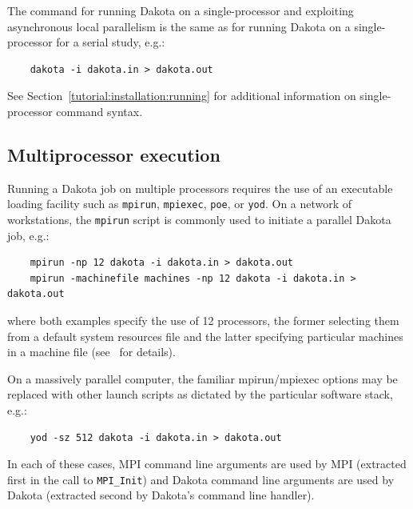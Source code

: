 The command for running Dakota on a single-processor and exploiting
asynchronous local parallelism is the same as for running Dakota on a
single-processor for a serial study, e.g.:
\begin{small}
\begin{verbatim}
    dakota -i dakota.in > dakota.out
\end{verbatim}
\end{small}

See Section~\ref{tutorial:installation:running} for additional
information on single-processor command syntax.

\subsection{Multiprocessor execution}\label{parallel:running:multiprocessor}

Running a Dakota job on multiple processors requires the use of an
executable loading facility such as \texttt{mpirun}, \texttt{mpiexec},
\texttt{poe}, or \texttt{yod}.  On a network of workstations, the
\texttt{mpirun} script is commonly used to initiate a parallel Dakota
job, e.g.:
\begin{small}
\begin{verbatim}
    mpirun -np 12 dakota -i dakota.in > dakota.out
    mpirun -machinefile machines -np 12 dakota -i dakota.in > dakota.out
\end{verbatim}
\end{small}
where both examples specify the use of 12 processors, the former
selecting them from a default system resources file and the latter
specifying particular machines in a machine file (see~\cite{Gro96} for
details).

On a massively parallel computer, the familiar mpirun/mpiexec options
may be replaced with other launch scripts as dictated by the
particular software stack, e.g.:
\begin{small}
\begin{verbatim}
    yod -sz 512 dakota -i dakota.in > dakota.out
\end{verbatim}
\end{small}

In each of these cases, MPI command line arguments are used by MPI
(extracted first in the call to \texttt{MPI\_Init}) and Dakota command
line arguments are used by Dakota (extracted second by Dakota's
command line handler). %

